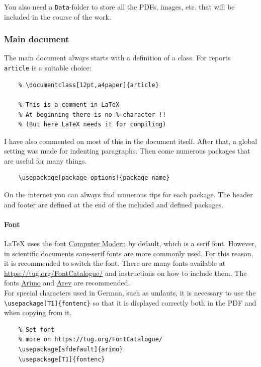 You also need a \verb|Data|-folder to store all the PDFs, images, etc. that will be included in the course of the work.


\subsubsection{Main document}

The main document always starts with a definition of a class. For reports \verb|article| is a suitable choice:

\begin{verbatim}
    % \documentclass[12pt,a4paper]{article}
    
    % This is a comment in LaTeX
    % At beginning there is no %-character !! 
    % (But here LaTeX needs it for compiling)
\end{verbatim}

I have also commented on most of this in the document itself. After that, a global setting was made for indenting paragraphs. Then come numerous packages that are useful for many things.

\begin{verbatim}
    \usepackage[package options]{package name}
\end{verbatim}

On the internet you can always find numerous tips for each package. The header and footer are defined at the end of the included and defined packages.

\paragraph{Font}

\LaTeX{} uses the font \href{https://en.wikipedia.org/wiki/Computer_Modern}{Computer Modern} by default, which is a serif font. However, in scientific documents sans-serif fonts are more commonly used. For this reason, it is recommended to switch the font. There are many fonts available at \url{https://tug.org/FontCatalogue/} and instructions on how to include them. The fonts \href{https://tug.org/FontCatalogue/arimo/}{Arimo} and \href{https://tug.org/FontCatalogue/arev/}{Arev} are recommended.\\

For special characters used in German, such as umlauts, it is necessary to use the \verb|\usepackage[T1]{fontenc}| so that it is displayed correctly both in the PDF and when copying from it.

\begin{verbatim}
    % Set font
    % more on https://tug.org/FontCatalogue/
    \usepackage[sfdefault]{arimo}
    \usepackage[T1]{fontenc}
\end{verbatim}

